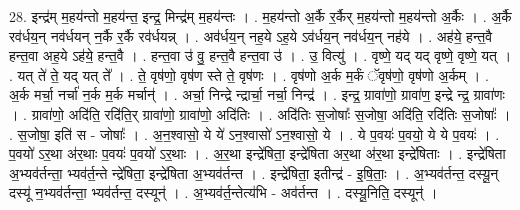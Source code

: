 \documentclass[17pt]{extarticle}
\begin{document}
28. इन्द्र॑म् म॒हय॑न्तो म॒हय॑न्त॒ इन्द्र॒ मिन्द्र॑म् म॒हय॑न्तः । . म॒हय॑न्तो अ॒र्कै र॒र्कैर् म॒हय॑न्तो म॒हय॑न्तो अ॒र्कैः । . अ॒र्कै रव॑र्धय॒न् नव॑र्धयन् न॒र्कै र॒र्कै रव॑र्धयन्न् । . अव॑र्धय॒न् नह॒ये ऽह॒ये ऽव॑र्धय॒न् नव॑र्धय॒न् नह॑ये । . अह॑ये॒ हन्त॒वै हन्त॒वा अह॒ये ऽह॑ये॒ हन्त॒वै । . हन्त॒वा उ॑ वु॒ हन्त॒वै हन्त॒वा उ॑ । . उ॒ वित्यु॑ । . वृष्णे॒ यद् यद् वृष्णे॒ वृष्णे॒ यत् । . यत् ते॑ ते॒ यद् यत् ते᳚ । . ते॒ वृष॑णो॒ वृष॑ण स्ते ते॒ वृष॑णः । . वृष॑णो अ॒र्क म॒र्कं ॅवृष॑णो॒ वृष॑णो अ॒र्कम् । . अ॒र्क मर्चा॒ नर्चा॑ न॒र्क म॒र्क मर्चान्॑ । . अर्चा॒ निन्द्रे न्द्रार्चा॒ नर्चा॒ निन्द्र॑ । . इन्द्र॒ ग्रावा॑णो॒ ग्रावा॑ण॒ इन्द्रे न्द्र॒ ग्रावा॑णः । . ग्रावा॑णो॒ अदि॑ति॒ रदि॑ति॒र् ग्रावा॑णो॒ ग्रावा॑णो॒ अदि॑तिः । . अदि॑तिः स॒जोषाः᳚ स॒जोषा॒ अदि॑ति॒ रदि॑तिः स॒जोषाः᳚ । . स॒जोषा॒ इति॑ स - जोषाः᳚ । . अ॒न॒श्वासो॒ ये ये॑ ऽन॒श्वासो॑ ऽन॒श्वासो॒ ये । . ये प॒वयः॑ प॒वयो॒ ये ये प॒वयः॑ । . प॒वयो॑ ऽर॒था अ॑र॒थाः प॒वयः॑ प॒वयो॑ ऽर॒थाः । . अ॒र॒था इन्द्रे॑षिता॒ इन्द्रे॑षिता अर॒था अ॑र॒था इन्द्रे॑षिताः । . इन्द्रे॑षिता अ॒भ्यव॑र्तन्ता॒ भ्यव॑र्त॒न्ते न्द्रे॑षिता॒ इन्द्रे॑षिता अ॒भ्यव॑र्तन्त । . इन्द्रे॑षिता॒ इतीन्द्र॑ - इ॒षि॒ताः॒ । . अ॒भ्यव॑र्तन्त॒ दस्यू॒न् दस्यू॑ न॒भ्यव॑र्तन्ता॒ भ्यव॑र्तन्त॒ दस्यून्॑ । . अ॒भ्यव॑र्त॒न्तेत्य॑भि - अव॑र्तन्त । . दस्यू॒निति॒ दस्यून्॑ । \newline
\end{document}
